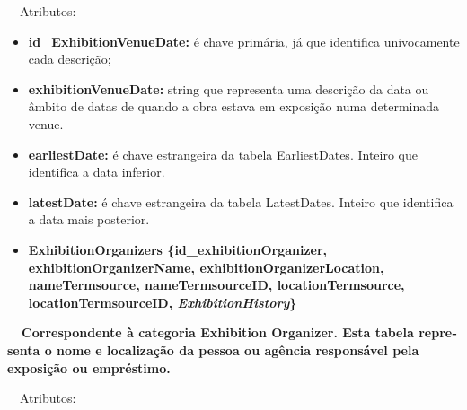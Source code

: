 \documentclass[letterpaper]{article}
\newcommand\textstyleStrongEmphasis[1]{\textbf{#1}}
\newcommand\liststyleLi{%
\renewcommand\labelitemi{{\textbullet}}
\renewcommand\labelitemii{[27A2?]}
\renewcommand\labelitemiii{{\textbullet}}
\renewcommand\labelitemiv{{\textbullet}}
}
\newcommand\liststyleLvi{%
\renewcommand\labelitemi{[27A2?]}
\renewcommand\labelitemii{[27A2?]}
\renewcommand\labelitemiii{[27A2?]}
\renewcommand\labelitemiv{[27A2?]}
}
\begin{document}
{
\ \ Atributos:}

\liststyleLvi
\begin{itemize}
\item {
\textbf{id\_}\textbf{ExhibitionVenueDate}\textbf{:} \'e chave
prim\'aria, j\'a que identifica univocamente cada descri\c{c}\~ao;}
\item {
\textbf{exhibitionVenueDate:} string que representa uma descri\c{c}\~ao
da data ou \^ambito de datas de quando a obra estava em exposi\c{c}\~ao
numa determinada venue.}
\item {
\textbf{earliestDate:} \'e chave estrangeira da tabela EarliestDates.
Inteiro que identifica a data inferior.}
\item {
\textbf{latestDate:} \'e chave estrangeira da tabela LatestDates.
Inteiro que identifica a data mais posterior.}
\end{itemize}

\bigskip

\liststyleLi
\begin{itemize}
\item {\bfseries
ExhibitionOrganizers\textmd{
\{}\textmd{id\_exhibitionOrganizer}\textmd{, exhibitionOrganizerName,
exhibitionOrganizerLocation, nameTermsource, nameTermsourceID,
locationTermsource, locationTermsourceID,
}\textmd{\textit{ExhibitionHistory}}\textmd{\}}}
\end{itemize}
{\bfseries
\foreignlanguage{english}{\textmd{\ \ Correspondente \`a categoria
}}\textstyleStrongEmphasis{\foreignlanguage{english}{Exhibition
Organizer}}\foreignlanguage{english}{\textmd{. Esta
}}\textstyleStrongEmphasis{\foreignlanguage{english}{\textmd{tabela}}}\foreignlanguage{english}{\textmd{
representa o nome e localiza\c{c}\~ao da pessoa ou ag\^encia
respons\'avel pela exposi\c{c}\~ao ou empr\'estimo.}}}


\bigskip

{
\ \ Atributos:}
\end{document}
